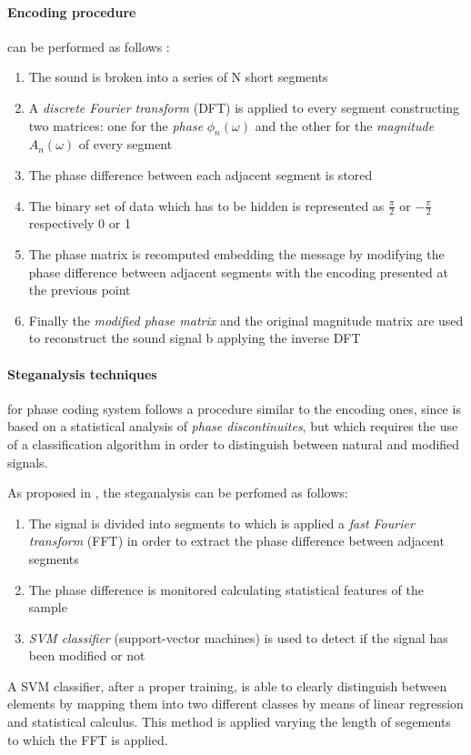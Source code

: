 \documentclass[../../main.tex]{subfiles}
\begin{document}
    \paragraph{Encoding procedure} can be performed as follows
    \cite{techniques-data-hiding}:
    \begin{enumerate}
        \item The sound is broken into a series of N short segments
        \item A \emph{discrete Fourier transform} (DFT) is applied to every
            segment constructing two matrices: one for the \emph{phase}
            $\phi_n(\omega)$ and the other for the \emph{magnitude}
            $A_n(\omega)$ of every segment
        \item The phase difference between each adjacent segment is stored
        \item The binary set of data which has to be hidden is represented as
            $\frac{\pi}{2}$ or $-\frac{\pi}{2}$ respectively 0 or 1
        \item The phase matrix is recomputed embedding the message by modifying
            the phase difference between adjacent segments with the encoding
            presented at the previous point
        \item Finally the \emph{modified phase matrix} and the original
            magnitude matrix are used to reconstruct the sound signal b
            applying the inverse DFT
    \end{enumerate}

    \paragraph{Steganalysis techniques} for phase coding system follows a
    procedure similar to the encoding ones, since is based on a statistical
    analysis of \emph{phase discontinuites}, but which requires the use of a
    classification algorithm in order to distinguish between natural and
    modified signals.
    
    As proposed in \cite{steganalysis-phase-coding}, the steganalysis can be
    perfomed as follows:
    \begin{enumerate}
        \item The signal is divided into segments to which is applied a
            \emph{fast Fourier transform} (FFT) in order to extract the phase
            difference between adjacent segments
        \item The phase difference is monitored calculating statistical features
            of the sample
        \item \emph{SVM classifier} (support-vector machines) is used to
            detect if the signal has been modified or not
    \end{enumerate}
    A SVM classifier, after a proper training, is able to clearly distinguish
    between elements by mapping them into two different classes by means of
    linear regression and statistical calculus.
    This method is applied varying the length of segements to which the FFT is
    applied.
\end{document}
